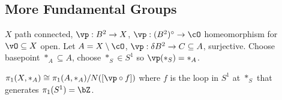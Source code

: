 
\subsection{More Fundamental Groups}

$X$ path connected, $\vp: B^2 \to X$, $\vp: (B^2)^{\circ} \to \cO$ homeomorphism for $\vO \subseteq X$ open. Let $A = X \setminus \cO$, $\vp: \delta B^2 \to C \subseteq A$, surjective. Choose basepoint $*_A \subseteq A$, choose $*_S \in S^1$ so $\vp(*_S) = *_A$. 

\begin{theorem}
    $\pi_1(X, *_A) \cong \pi_1(A, *_A)/N([\vp \circ f])$ where $f$ is the loop in $S^1$ at $*_S$ that generates $\pi_1(S^1) = \bZ$. 
\end{theorem}

